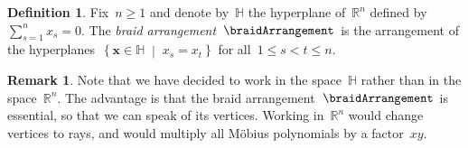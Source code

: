 \documentclass{amsart}
\newcommand{\darkblue}{\color{darkblue}} %
\theoremstyle{definition}
\newtheorem{definition}[theorem]{Definition}
\newtheorem{remark}[theorem]{Remark}
\newcommand{\R}{\mathbb{R}} %
\renewcommand{\b}[1]{{\boldsymbol{#1}}} %
\newcommand{\set}[2]{\left\{ #1 \;\middle|\; #2 \right\}} %
\newcommand{\defn}[1]{\textsl{\darkblue #1}} %
\renewcommand{\b}[1]{\boldsymbol{#1}} %
\newcommand{\HH}{\mathbb{H}} %
\begin{document}

\begin{definition}
Fix~$n \ge 1$ and denote by~$\HH$ the hyperplane of~$\R^n$ defined by~$\sum_{s = 1}^n x_s = 0$.
The \defn{braid arrangement}~$\braidArrangement$ is the arrangement of the hyperplanes~$\set{\b{x} \in \HH}{x_s = x_t}$ for all~$1 \le s < t \le n$.
\end{definition}

\begin{remark}
\label{rem:essential}
Note that we have decided to work in the space~$\HH$ rather than in the space~$\R^n$.
The advantage is that the braid arrangement~$\braidArrangement$ is essential, so that we can speak of its vertices.
Working in~$\R^n$ would change vertices to rays, and would multiply all M\"obius polynomials by a factor~$xy$.
\end{remark}
\end{document}
